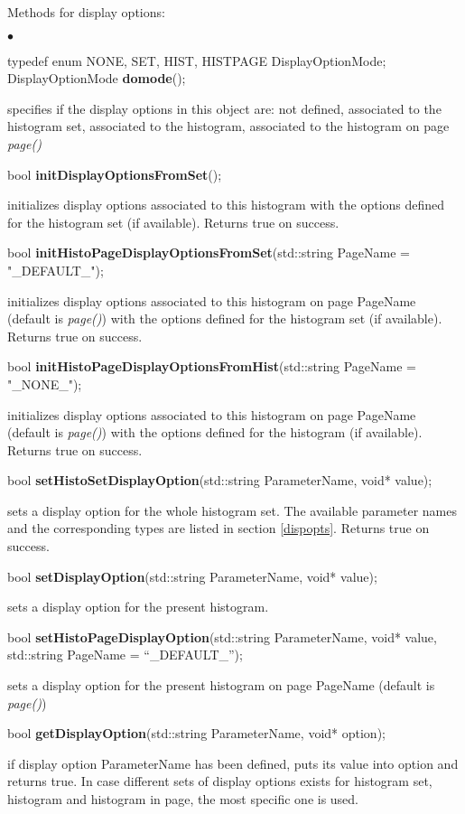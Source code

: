\documentclass{lhcbnote}
\begin{document}
Methods for display options:
\begin{list}{$\bullet$}{}
\item typedef enum { NONE, SET, HIST, HISTPAGE } DisplayOptionMode;\\
     DisplayOptionMode {\bf domode}();
  
specifies if the display options in this object are: not defined,
associated to the histogram set, associated to the histogram,
associated to the histogram on  page {\it page()}
  
\item  bool {\bf initDisplayOptionsFromSet}(); 

initializes display options associated to this histogram with the
options defined for the histogram set (if available). Returns true on
success.

\item  bool {\bf initHistoPageDisplayOptionsFromSet}(std::string PageName = "\_DEFAULT\_");

initializes display options associated to this histogram on page
PageName (default is {\it page()}) with the
options defined for the histogram set (if available). Returns true on
success.

\item  bool {\bf initHistoPageDisplayOptionsFromHist}(std::string PageName = "\_NONE\_"); 

initializes display options associated to this histogram on page
PageName (default is {\it page()}) with the
options defined for the histogram (if available). Returns true on
success.

\item   bool {\bf setHistoSetDisplayOption}(std::string ParameterName, 
				void* value);

sets a display option for the whole histogram set. The available
parameter names and the corresponding types are listed in section
\ref{dispopts}. Returns true on success.


\item bool {\bf setDisplayOption}(std::string ParameterName, 
			void* value);

sets a display option for the present histogram.
\item  bool {\bf setHistoPageDisplayOption}(std::string ParameterName, 
				 void* value,
				 std::string PageName = ``\_DEFAULT\_'');

sets a display option for the present histogram on page
PageName (default is {\it page()})

\item   bool {\bf getDisplayOption}(std::string ParameterName,
					 void* option);

if display option  ParameterName has been defined, puts its value into
option and returns true. In case different sets of display options
exists for histogram set, histogram and histogram in page, the most
specific one is used.

\end{list}
\end{document}
